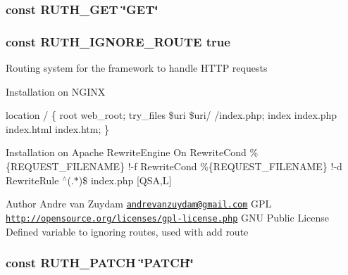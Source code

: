 \subsubsection[{R\+U\+T\+H\+\_\+\+G\+E\+T}]{\setlength{\rightskip}{0pt plus 5cm}const R\+U\+T\+H\+\_\+\+G\+E\+T \char`\"{}G\+E\+T\char`\"{}}\label{Ruth_8php_acc73cd34b6fcffd15a4fdd050e0a86d8}
\hypertarget{Ruth_8php_a007827b20a122223418cd0bed933b32c}{}
\subsubsection[{R\+U\+T\+H\+\_\+\+I\+G\+N\+O\+R\+E\+\_\+\+R\+O\+U\+T\+E}]{\setlength{\rightskip}{0pt plus 5cm}const R\+U\+T\+H\+\_\+\+I\+G\+N\+O\+R\+E\+\_\+\+R\+O\+U\+T\+E true}\label{Ruth_8php_a007827b20a122223418cd0bed933b32c}
Routing system for the framework to handle H\+T\+T\+P requests

Installation on N\+G\+I\+N\+X

location / \{ root web\+\_\+root; try\+\_\+files \$uri \$uri/ /index.php; index index.\+php index.\+html index.\+htm; \}

Installation on Apache Rewrite\+Engine On Rewrite\+Cond \%\{R\+E\+Q\+U\+E\+S\+T\+\_\+\+F\+I\+L\+E\+N\+A\+M\+E\} !-\/f Rewrite\+Cond \%\{R\+E\+Q\+U\+E\+S\+T\+\_\+\+F\+I\+L\+E\+N\+A\+M\+E\} !-\/d Rewrite\+Rule $^\wedge$(.$\ast$)\$ index.\+php \mbox{[}Q\+S\+A,L\mbox{]}

\begin{DoxyAuthor}{Author}
Andre van Zuydam \href{mailto:andrevanzuydam@gmail.com}{\tt andrevanzuydam@gmail.\+com}  G\+P\+L  \href{http://opensource.org/licenses/gpl-license.php}{\tt http\+://opensource.\+org/licenses/gpl-\/license.\+php} G\+N\+U Public License Defined variable to ignoring routes, used with add route 
\end{DoxyAuthor}
\hypertarget{Ruth_8php_a6b1071e153d1a5e0a9296990867f0b61}{}
\subsubsection[{R\+U\+T\+H\+\_\+\+P\+A\+T\+C\+H}]{\setlength{\rightskip}{0pt plus 5cm}const R\+U\+T\+H\+\_\+\+P\+A\+T\+C\+H \char`\"{}P\+A\+T\+C\+H\char`\"{}}\label{Ruth_8php_a6b1071e153d1a5e0a9296990867f0b61}
\hypertarget{Ruth_8php_af749f90f066c3572c6dae5f01eb61af8}{}
